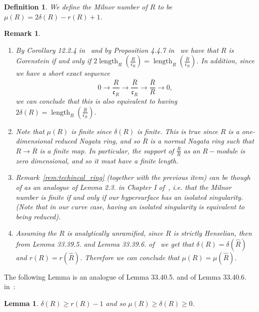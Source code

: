 \documentclass{article}
\newtheorem{definition}[theorem]{Definition}
\newtheorem{lemma}[theorem]{Lemma}
\newtheorem{remark}[theorem]{Remark}
\DeclareMathOperator{\length}{length}
\numberwithin{theorem}{section}
\begin{document}
\begin{definition}\label{def:Milnor}
 We define the Milnor number of $R$ to be $\mu(R)= 2 \delta(R)-r(R) + 1$.
\end{definition}

\begin{remark}\label{rem:conductor}
\begin{enumerate}
    \item \textup{By Corollary 12.2.4 in~\cite{huneke2006integral} and by Proposition 4.4.7 in~\cite{campillo2006algebroid} we have that $R$ is Gorenstein if and only if   $2\length_R(\frac{R}{\mathfrak{c}_R}) = \length_R(\frac{\overline{R}}{\mathfrak{c}_R}) $. In addition, since we have a short exact sequence
    \begin{equation*}
        0 \to \frac{R}{\mathfrak{c}_R} \to \frac{\overline{R}}{\mathfrak{c}_R} \to  \frac{\overline{R}}{R} \to 0, 
    \end{equation*}
    \noindent we can conclude that this is also equivalent to having $2 \delta(R)=  \length_R(\frac{\overline{R}}{\mathfrak{c}_R})$. }
    \item \textup{Note that $\mu(R)$ is finite since $\delta(R)$ is finite. This is true since $R$ is a one-dimensional reduced Nagata ring, and so $\overline{R}$ is a normal Nagata ring such that $R \to \overline{R}$ is a finite map. In particular, the support of $\frac{\overline{R}}{R}$ as an $R-$module is zero dimensional, and so it must have a finite length. }
    \item \textup{Remark~\ref{rem:techincal_ring} (together with the previous item) can be though of as an analogue of Lemma 2.3. in Chapter I of~\cite{greuel2007introduction}, i.e. that the Milnor number is finite if and only if our hypersurface has an isolated singularity. (Note that in our curve case, having an isolated singularity is equivalent to being reduced).  }
    \item \textup{Assuming the $R$ is analytically unramified, since $R$ is strictly Henselian, then from Lemma 33.39.5. and Lemma 33.39.6. of~\cite{stacks-project} we get that $\delta(R)=\delta(\hat{R})$ and $r(R)=r(\hat{R})$. Therefore we can conclude that $\mu(R)=\mu(\hat{R})$.  }
\end{enumerate}
\end{remark}

The following Lemma is an analogue of Lemma 33.40.5. and of  Lemma 33.40.6. in~\cite{stacks-project}:

\begin{lemma}\label{lem:milnor_nonneg}
    $\delta(R) \geq r(R)-1$ and so $\mu(R) \geq \delta(R) \geq 0$. 
\end{lemma}
\end{document}
